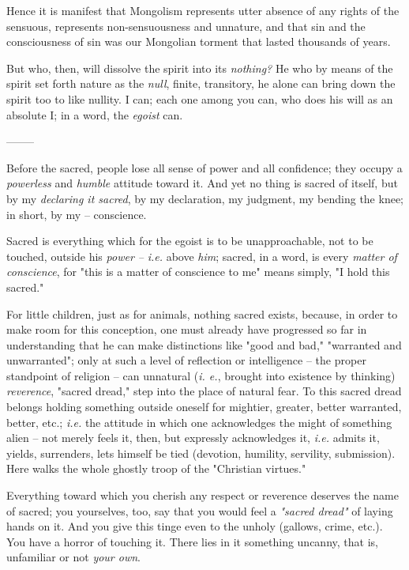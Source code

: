 Hence it is manifest that Mongolism represents utter absence of any rights of 
the sensuous, represents non-sensuousness and unnature, and that sin and the 
consciousness of sin was our Mongolian torment that lasted thousands of years.

But who, then, will dissolve the spirit into its \textit{nothing?} He who by 
means of the spirit set forth nature as the \textit{null}, finite, transitory, 
he alone can bring down the spirit too to like nullity. I can; each one among 
you can, who does his will as an absolute I; in a word, the \textit{egoist} 
can.

\begin{center}
--------\end{center}


Before the sacred, people lose all sense of power and all confidence; they 
occupy a \textit{powerless} and \textit{humble} attitude toward it. And yet no 
thing is sacred of itself, but by my \textit{declaring it sacred}, by my 
declaration, my judgment, my bending the knee; in short, by my -- conscience.

Sacred is everything which for the egoist is to be unapproachable, not to be 
touched, outside his \textit{power --} \textit{i.e.} above \textit{him}; 
sacred, in a word, is every \textit{matter of conscience}, for "{}this is a 
matter of conscience to me"{} means simply, "{}I hold this sacred."{}

For little children, just as for animals, nothing sacred exists, because, in 
order to make room for this conception, one must already have progressed so 
far in understanding that he can make distinctions like "{}good and bad,"{} 
"{}warranted and unwarranted"{}; only at such a level of reflection or 
intelligence -- the proper standpoint of religion -- can unnatural (\textit{i. 
e.}, brought into existence by thinking) \textit{reverence}, "{}sacred 
dread,"{} step into the place of natural fear. To this sacred dread belongs 
holding something outside oneself for mightier, greater, better warranted, 
better, etc.; \textit{i.e.} the attitude in which one acknowledges the might 
of something alien -- not merely feels it, then, but expressly acknowledges 
it, \textit{i.e.} admits it, yields, surrenders, lets himself be tied 
(devotion, humility, servility, submission). Here walks the whole ghostly 
troop of the "{}Christian virtues."{}

Everything toward which you cherish any respect or reverence deserves the name 
of sacred; you yourselves, too, say that you would feel a \textit{"{}sacred 
dread"{}} of laying hands on it. And you give this tinge even to the unholy 
(gallows, crime, etc.). You have a horror of touching it. There lies in it 
something uncanny, that is, unfamiliar or not \textit{your own}.

